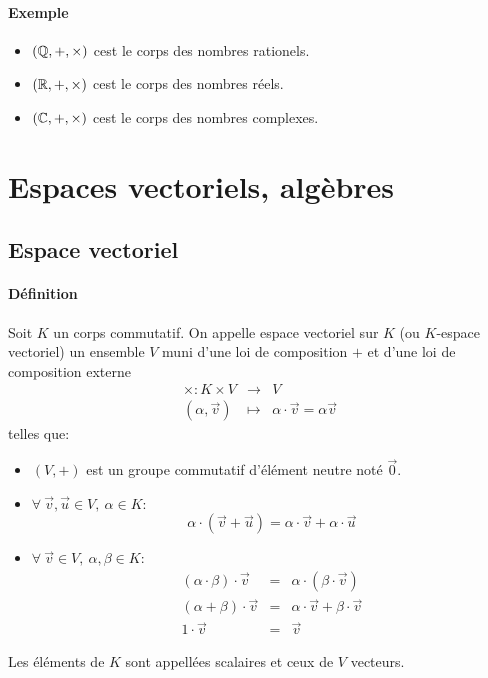 \paragraph{Exemple}
\begin{itemize}
  \item $(\mathbb{Q}, +, \times)$ cest le corps des nombres rationels.
  \item $(\mathbb{R}, +, \times)$ cest le corps des nombres réels.
  \item $(\mathbb{C}, +, \times)$ cest le corps des nombres complexes.
\end{itemize}

%
%
\section{Espaces vectoriels, algèbres}
%
%

%
\subsection{Espace vectoriel}
%
\paragraph{Définition} Soit $K$ un corps commutatif. On appelle espace vectoriel sur $K$ (ou $K$-espace vectoriel) un ensemble $V$ muni d'une loi de composition $+$ et d'une loi de composition externe
\begin{eqnarray*}
  \times: K \times V &\rightarrow& V \\
  (\alpha, \vec{v}) &\mapsto& \alpha\cdot\vec{v} = \alpha\vec{v}
\end{eqnarray*}
telles que:
\begin{itemize}
  \item $(V, +)$ est un groupe commutatif d'élément neutre noté $\vec{0}$.
  \item $\forall ~ \vec{v}, \vec{u} \in V, ~ \alpha \in K$: 
    $$\alpha \cdot (\vec{v}+\vec{u}) = \alpha \cdot \vec{v} + \alpha \cdot \vec{u}$$
  \item $\forall ~ \vec{v} \in V, ~ \alpha, \beta \in K$:
    \begin{eqnarray*}
      (\alpha \cdot \beta) \cdot \vec{v} &=& \alpha \cdot (\beta \cdot \vec{v}) \\
      (\alpha + \beta) \cdot \vec{v} &=& \alpha \cdot \vec{v} + \beta \cdot \vec{v} \\
      1 \cdot \vec{v} &=& \vec{v}
    \end{eqnarray*}
\end{itemize}
Les éléments de $K$ sont appellées scalaires et ceux de $V$ vecteurs.


